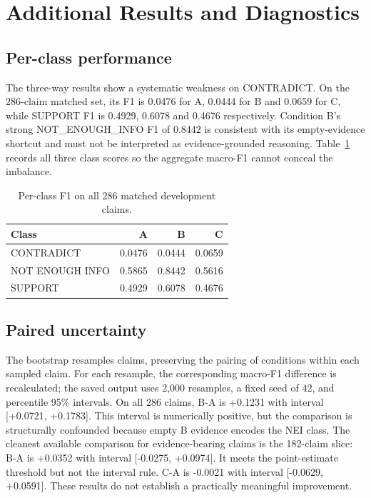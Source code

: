 \documentclass[10pt]{article}
\begin{document}
\section{Additional Results and Diagnostics}
\subsection{Per-class performance}
The three-way results show a systematic weakness on CONTRADICT. On the 286-claim matched set, its F1 is 0.0476 for A, 0.0444 for B and 0.0659 for C, while SUPPORT F1 is 0.4929, 0.6078 and 0.4676 respectively. Condition B's strong NOT\_ENOUGH\_INFO F1 of 0.8442 is consistent with its empty-evidence shortcut and must not be interpreted as evidence-grounded reasoning. Table~\ref{tab:classf1} records all three class scores so the aggregate macro-F1 cannot conceal the imbalance.

\begin{table}[ht]
\centering\small
\caption{Per-class F1 on all 286 matched development claims.}
\label{tab:classf1}
\begin{tabular}{lrrr}
\toprule
Class & A & B & C\\
\midrule
CONTRADICT & 0.0476 & 0.0444 & 0.0659\\
NOT ENOUGH INFO & 0.5865 & 0.8442 & 0.5616\\
SUPPORT & 0.4929 & 0.6078 & 0.4676\\
\bottomrule
\end{tabular}
\end{table}

\subsection{Paired uncertainty}
The bootstrap resamples claims, preserving the pairing of conditions within each sampled claim. For each resample, the corresponding macro-F1 difference is recalculated; the saved output uses 2,000 resamples, a fixed seed of 42, and percentile 95\% intervals. On all 286 claims, B-A is +0.1231 with interval [+0.0721, +0.1783]. This interval is numerically positive, but the comparison is structurally confounded because empty B evidence encodes the NEI class. The cleanest available comparison for evidence-bearing claims is the 182-claim slice: B-A is +0.0352 with interval [-0.0275, +0.0974]. It meets the point-estimate threshold but not the interval rule. C-A is -0.0021 with interval [-0.0629, +0.0591]. These results do not establish a practically meaningful improvement.
\end{document}
